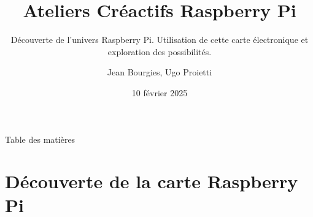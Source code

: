 \documentclass[aspectratio=169,xcolor=dvipsnames]{beamer}
\title{Ateliers Créactifs Raspberry Pi}
\subtitle{Découverte de l'univers Raspberry Pi. Utilisation de cette carte électronique et exploration des possibilités.}
\author{Jean Bourgies, Ugo Proietti}
\date{10 février 2025}
\begin{document}
\begin{frame}
    \titlepage
\end{frame}

\begin{frame}{Table des matières}
    \tableofcontents
\end{frame}

\section{Découverte de la carte Raspberry Pi}
\end{document}
